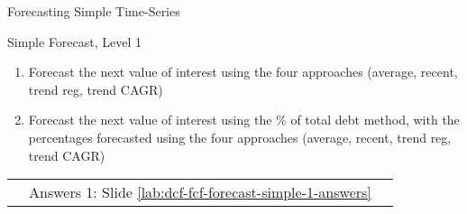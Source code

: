 \documentclass[handout, 11pt]{beamer}
\begin{document}
\begin{section}{Forecasting Simple Time-Series}
\begin{frame}
{\begin{block}{Simple Forecast, Level 1}
\begin{enumerate}
\item Forecast the next value of interest using the four approaches (average, recent, trend reg, trend CAGR)
\item Forecast the next value of interest using the \% of total debt method, with the percentages forecasted using the four approaches (average, recent, trend reg, trend CAGR)
\end{enumerate}
\vfill
\begin{tabular*}{\textwidth}{@{\extracolsep{\fill}}ccc}
\toprule
\hfill & Answers 1: Slide \textcolor{blue}{\underline{\ref{lab:dcf-fcf-forecast-simple-1-answers}}} & \hfill\\

\end{tabular*}
\end{block}
}
\label{lab:dcf-fcf-forecast-simple-1}
\end{frame}
\end{section}
\end{document}
